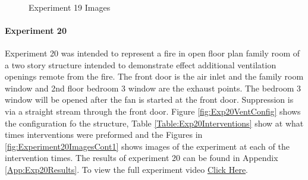 \documentclass{article}
\begin{document}
\begin{figure}[H]
	\ContinuedFloat 
	\centering 
	 \ 
	\caption{Experiment 19 Images}
	\label{fig:Experiment19ImagesCont3} 
\end{figure}

\paragraph{Experiment 20}\mbox{}

Experiment 20 was intended to represent a fire in open floor plan family room of a two story structure intended to demonstrate effect additional ventilation openings remote from the fire. The front door is the air inlet and the family room window and 2nd floor bedroom 3 window are the exhaust points. The bedroom 3 window will be opened after the fan is started at the front door. Suppression is via a straight stream through the front door. Figure \ref{fig:Exp20VentConfig} shows the configuration fo the structure, Table \ref{Table:Exp20Interventions} show at what times interventions were preformed and the Figures in \ref{fig:Experiment20ImagesCont1} shows images of the experiment at each of the intervention times. The results of experiment 20 can be found in Appendix \ref{App:Exp20Results}. To view the full experiment video \href{https://youtu.be/lMBMZXApou4}{Click Here}.
\end{document}
